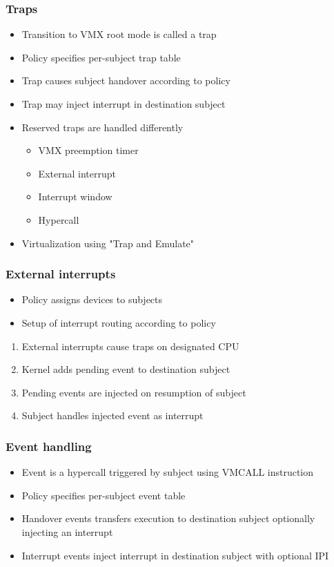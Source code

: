 \documentclass[xcolor={dvipsnames}]{beamer}
\begin{document}
\begin{frame}\frametitle{Traps}
\begin{itemize}
	\item Transition to VMX root mode is called a trap
	\item Policy specifies per-subject trap table
	\item Trap causes subject handover according to policy
	\item Trap may inject interrupt in destination subject
	\item Reserved traps are handled differently
		\begin{itemize}
			\item VMX preemption timer
			\item External interrupt
			\item Interrupt window
			\item Hypercall
		\end{itemize}
	\item Virtualization using "Trap and Emulate"
\end{itemize}

\end{frame}

\begin{frame}\frametitle{External interrupts}
\begin{itemize}
	\item Policy assigns devices to subjects
	\item Setup of interrupt routing according to policy
\end{itemize}
\begin{center}
	\noindent\resizebox{.55\textwidth}{!}{}
\end{center}
\begin{enumerate}
	\item External interrupts cause traps on designated CPU
	\item Kernel adds pending event to destination subject
	\item Pending events are injected on resumption of subject
	\item Subject handles injected event as interrupt
\end{enumerate}
\end{frame}

\begin{frame}\frametitle{Event handling}
\begin{itemize}
	\item Event is a hypercall triggered by subject using VMCALL instruction
	\item Policy specifies per-subject event table
	\item Handover events transfers execution to destination subject optionally injecting an interrupt
	\item Interrupt events inject interrupt in destination subject with optional IPI
\end{itemize}

\end{frame}
\end{document}
